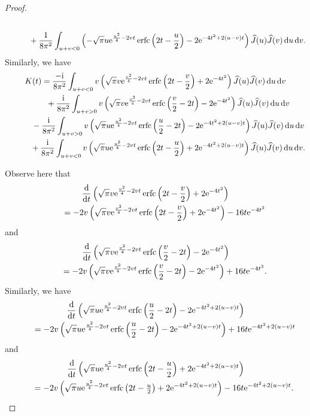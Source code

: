 \documentclass[pdftex]{sigma}
\numberwithin{equation}{section}
\newcommand{\erfc}{\operatorname{erfc}}
\newcommand{\1}{\chi}
\def\wh{\widehat}
\begin{document}
\begin{proof}
\begin{gather*}
			\\
\hphantom{L(t)=}{} +\frac{1}{8\pi^2} \int_{ u+v<0 } \left(-\sqrt{\pi}u {\rm e}^{ \frac{u^2}{4}-2vt } \erfc\left( 2t-\frac{u}{2} \right)-2 {\rm e}^{-4t^2+2(u-v)t}\right) \wh{J}(u) \wh{J}(v) \,{\rm d}u\,{\rm d}v.	
		\end{gather*}
	Similarly, we have
	\begin{gather*}
			K(t) =\frac{-{\rm i}}{8\pi^2} \int_{ u+v<0 } v\left(\sqrt{\pi}v {\rm e}^{ \frac{v^2}{4}-2vt } \erfc\left( 2t-\frac{v}{2} \right)+2 {\rm e}^{-4t^2}\right) \wh{J}(u) \wh{J}(v) \,{\rm d}u\,{\rm d}v
			\\
\hphantom{K(t) =}{}
 +\frac{{\rm i}}{8\pi^2} \int_{ u+v>0 } v\left(\sqrt{\pi}v {\rm e}^{ \frac{v^2}{4}-2vt } \erfc\left( \frac{v}{2}-2t \right)-2 {\rm e}^{-4t^2}\right) \wh{J}(u) \wh{J}(v) \,{\rm d}u\,{\rm d}v
			\\
\hphantom{K(t) =}{} -\frac{{\rm i}}{8\pi^2} \int_{ u+v>0 } v\left(\sqrt{\pi}u {\rm e}^{ \frac{u^2}{4}-2vt } \erfc\left( \frac{u}{2}-2t \right)-2 {\rm e}^{-4t^2+2(u-v)t}\right) \wh{J}(u) \wh{J}(v) \,{\rm d}u\,{\rm d}v
			\\
\hphantom{K(t) =}{} +\frac{{\rm i}}{8\pi^2} \int_{ u+v<0 } v\left(\sqrt{\pi}u {\rm e}^{ \frac{u^2}{4}-2vt } \erfc\left( 2t-\frac{u}{2} \right)+2 {\rm e}^{-4t^2+2(u-v)t}\right) \wh{J}(u) \wh{J}(v) \,{\rm d}u\,{\rm d}v.
		\end{gather*}
	
	Observe here that
	\begin{gather*}
	\frac{{\rm d}}{{\rm d}t} \left(\sqrt{\pi}v {\rm e}^{ \frac{v^2}{4}-2vt } \erfc\left( 2t-\frac{v}{2} \right)+2 {\rm e}^{-4t^2}\right)\\
\qquad{} =-2v \left(\sqrt{\pi}v {\rm e}^{ \frac{v^2}{4}-2vt } \erfc\left( 2t-\frac{v}{2} \right)+2 {\rm e}^{-4t^2}\right)-16t {\rm e}^{-4t^2}
	\end{gather*}
	and
	\begin{gather*}
	\frac{{\rm d}}{{\rm d}t} \left(\sqrt{\pi}v {\rm e}^{ \frac{v^2}{4}-2vt } \erfc\left( \frac{v}{2}-2t \right)-2 {\rm e}^{-4t^2}\right)\\
\qquad{}
 =-2v \left(\sqrt{\pi}v {\rm e}^{ \frac{v^2}{4}-2vt } \erfc\left( \frac{v}{2}-2t \right)-2 {\rm e}^{-4t^2}\right)+16t {\rm e}^{-4t^2}.
	\end{gather*}
	Similarly, we have
	\begin{gather*}
 \frac{{\rm d}}{{\rm d}t} \left(\sqrt{\pi}u {\rm e}^{ \frac{u^2}{4}-2vt } \erfc\left( \frac{u}{2}-2t \right)-2 {\rm e}^{-4t^2+2(u-v)t}\right)
		\\
\qquad{}=-2v \left(\sqrt{\pi}u {\rm e}^{ \frac{u^2}{4}-2vt } \erfc\left( \frac{u}{2}-2t \right)-2 {\rm e}^{-4t^2+2(u-v)t}\right)+16t{\rm e}^{-4t^2+2(u-v)t}
	\end{gather*}
	and
	\begin{gather*}
 \frac{{\rm d}}{{\rm d}t} \left(\sqrt{\pi}u {\rm e}^{ \frac{u^2}{4}-2vt } \erfc\left( 2t-\frac{u}{2} \right)+2 {\rm e}^{-4t^2+2(u-v)t}\right)
		\\
\qquad=-2v \left(\sqrt{\pi}u {\rm e}^{ \frac{u^2}{4}-2vt } \erfc\left( 2t-\tfrac{u}{2} \right)+2 {\rm e}^{-4t^2+2(u-v)t}\right) -16t{\rm e}^{-4t^2+2(u-v)t}.
	\end{gather*}
	

\end{proof}
\end{document}
